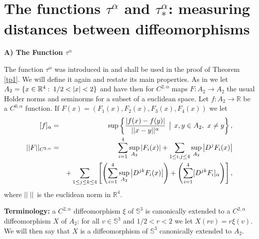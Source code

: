 \documentclass{article}
\def\S3{{\mathbb S^3}}
\begin{document}
\vspace{.15in}

 
 
 
 


\section{The functions $\tau^\alpha$ and $\tau^\alpha_*$: measuring distances between diffeomorphisms}\label{s1}

\vspace{.1in}


\noindent
{\bf A) The Function $\tau^\alpha$}

\vspace{.2in}


The function $\tau^\alpha$ was introduced in \cite{p1} and shall be used in the proof of Theorem \ref{tp1}. We will define it again and restate its main properties. 
As in \cite[Sect. 4]{p1} we let $A_2=\{x\in \mathbb R^4:\hspace{.03in} 1/2<|x|<2\}$ and have then for $C^{2,\alpha}$ maps $F:A_2\to A_2$  the usual Holder norms and seminorms for a subset of a euclidean space. Let $f:A_2\to\mathbb R$ be a $C^{0,\alpha}$ function. If $F(x)=(F_1(x),F_2(x),F_3(x),F_4(x))$ we let
\begin{eqnarray}\label{eqnh1}
[f]_{\alpha}&=&\sup\left\{\frac{|f(x)-f(y)|}{||x-y||^\alpha}\hspace{.06in}\big|\hspace{.06in}{x,y\in A_2},\ {x\neq y}\right\},\\ \nonumber
||F||_{C^{2,\alpha}}&=& \sum_{i=1}^4\sup_{A_2}|F_i(x)|+ \sum_{1\leq i,j \leq 4} \sup_{A_2}\left|{D^j F_i(x)}\right|\\ \label{eqnh2}
&&+\sum_{1\leq j\leq k\leq 4}\left[\left(\sum_{i=1}^4\sup_{A_2}\left|D^{jk} F_i(x)\right|
\right)+\left( \sum_{i=1}^4[D^{jk} F_i]_{\alpha}\right)\right],
\end{eqnarray}
where $||\hspace{.02in}\hspace{.02in}||$ is the euclidean norm in $\mathbb R^4$.
\medskip



\noindent
{\bf Terminology:} a $C^{2,\alpha}$ diffeomorphism $\xi$ of $\S3$ is canonically 
extended to a $C^{2,\alpha}$ diffeomorphism $X$ of $A_2$: for all $v\in \S3$ and $1/2< r<2$  
we let $X(rv)=r\xi(v)$. We will then say that $X$ is a diffeomorphism of $\S3$ canonically extended to $A_2$.\medskip
\end{document}
